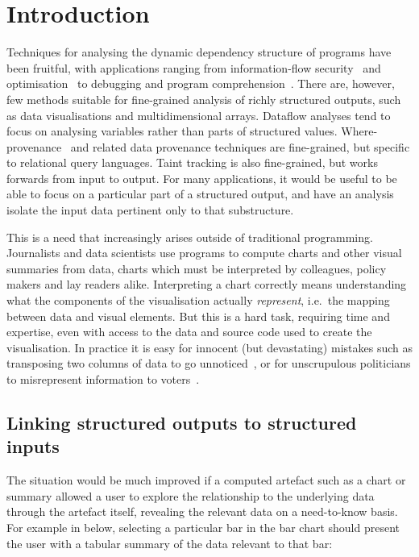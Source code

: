 \section{Introduction}

Techniques for analysing the dynamic dependency structure of programs have been fruitful, with applications ranging from information-flow security~\cite{sabelfeld03} and optimisation~\cite{kildall73} to debugging and program comprehension~\cite{weiser81,delucia96}. There are, however, few methods suitable for fine-grained analysis of richly structured outputs, such as data visualisations and multidimensional arrays. Dataflow analyses \cite{reps95} tend to focus on analysing variables rather than parts of structured values. Where-provenance~\cite{buneman01} and related data provenance techniques are fine-grained, but specific to relational query languages. Taint tracking \cite{newsome05} is also fine-grained, but works forwards from input to output. For many applications, it would be useful to be able to focus on a particular part of a structured output, and have an analysis isolate the input data pertinent only to that substructure.

This is a need that increasingly arises outside of traditional programming. Journalists and data scientists use programs to compute charts and other visual summaries from data, charts which must be interpreted by colleagues, policy makers and lay readers alike. Interpreting a chart correctly means understanding what the components of the visualisation actually \emph{represent}, i.e.~the mapping between data and visual elements. But this is a hard task, requiring time and expertise, even with access to the data and source code used to create the visualisation. In practice it is easy for innocent (but devastating) mistakes such as transposing two columns of data to go unnoticed~\cite{miller06}, or for unscrupulous politicians to misrepresent information to voters~\cite{fullfact19}.

\subsection{Linking structured outputs to structured inputs}

The situation would be much improved if a computed artefact such as a chart or summary allowed a user to explore the relationship to the underlying data through the artefact itself, revealing the relevant data on a need-to-know basis. For example in  below, selecting a particular bar in the bar chart should present the user with a tabular summary of the data relevant to that bar:

